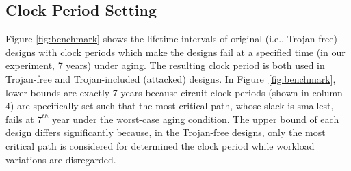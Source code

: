 \subsection{Clock Period Setting}
\label{sec:exp:tc}
Figure \ref{fig:benchmark} shows the lifetime intervals of original (i.e., Trojan-free) designs with clock periods which make the designs fail at a specified time (in our experiment, 7 years) under aging. The resulting clock period is both used in Trojan-free and Trojan-included (attacked) designs. In Figure~\ref{fig:benchmark}, lower bounds are exactly 7 years because circuit clock periods (shown in column 4) are specifically set such that the most critical path, whose slack is smallest, fails at $7^{th}$ year under the worst-case aging condition. The upper bound of each design differs significantly because, in the Trojan-free designs, only the most critical path is considered for determined the clock period while workload variations are disregarded.



